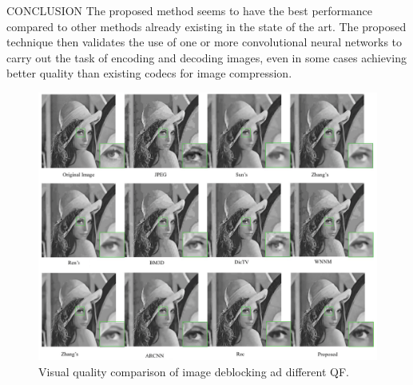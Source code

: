 \begin{frame}{CONCLUSION}
    The proposed method seems to have the best performance compared to other 
    methods already existing in the state of the art. The proposed technique 
    then validates the use of one or more convolutional neural networks to carry 
    out the task of encoding and decoding images, even in some cases achieving 
    better quality than existing codecs for image compression.
    \begin{figure}[htbp]
        \centering
        \includegraphics[width = 0.5 \linewidth]{images/paper3/final.png}
        \centering
        \caption{Visual quality comparison of image deblocking ad different QF.}
        \label{fig:final comparison}
    \end{figure}
\end{frame}